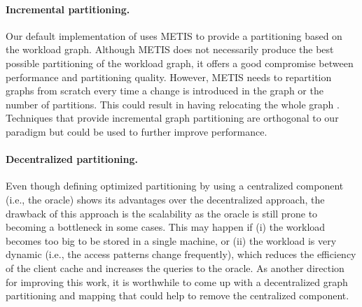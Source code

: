 \paragraph{Incremental partitioning.} Our default implementation of \dynastar
uses METIS \cite{abou2006multilevel} to provide a partitioning based on the
workload graph. Although METIS does not necessarily produce the best possible
partitioning of the workload graph, it offers a good compromise between
performance and partitioning quality. However, METIS needs to repartition graphs
from scratch every time a change is introduced in the graph or the number of
partitions. This could result in having \dynastar relocating the whole graph
\cite{SerafiniTEPAS16}. Techniques that provide incremental graph
partitioning are orthogonal to our paradigm but could be used to further
improve \dynastar performance.


\paragraph{Decentralized partitioning.} Even though defining optimized
partitioning by using a centralized component (i.e., the oracle) shows its
advantages over the decentralized approach, the drawback of this approach is the
scalability as the oracle is still prone to becoming a bottleneck in some cases.
This may happen if (i) the workload becomes too big to be stored in a single
machine, or (ii) the workload is very dynamic (i.e., the access patterns change 
frequently), which reduces the efficiency of the client cache and 
increases the queries to the oracle. As another direction for improving this
work, it is worthwhile to come up with a decentralized graph partitioning and
mapping that could help to remove the centralized component.
